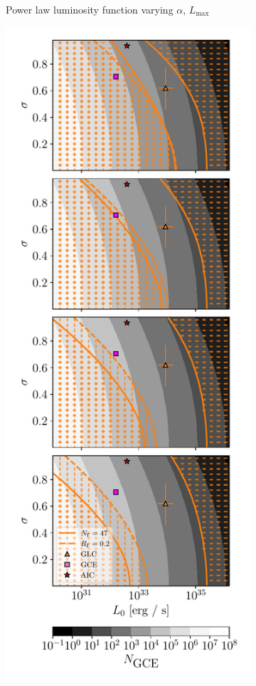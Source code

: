 \documentclass[a4paper,11pt]{article}
\begin{document}
\begin{figure}
\begin{subfigure}[b]{0.32\textwidth}
        \caption{Power law luminosity function varying $\alpha$, $L_\text{max}$}
    \end{subfigure}
    \hfill
    \begin{subfigure}[b]{0.32\textwidth}
        \includegraphics[width=\textwidth]{figs/log-normal-sensitivity.pdf}

\end{subfigure}
\end{figure}
\end{document}
